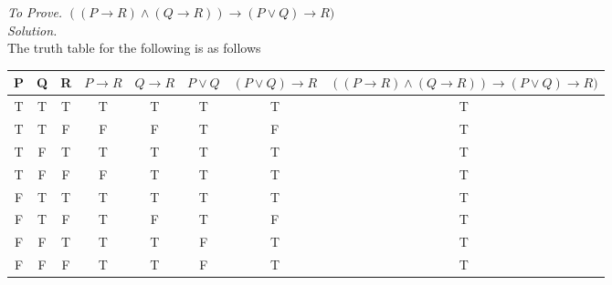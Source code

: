 \documentclass[11pt]{article}
\begin{document}
\vspace{20pt}
\noindent \emph{To Prove. } $((P \longrightarrow R)\land(Q \longrightarrow R))\longrightarrow(P \lor Q)\longrightarrow R)$ \medskip \\
\emph{Solution. } \\
The truth table for the following is as follows \\
\begingroup
\centering
\begin{tabular}{|c|c|c|c|c|c|c|c|}
	\hline
	P & Q & R & $P \longrightarrow R$ & $Q \longrightarrow R$ & $P \lor Q$ & $(P \lor Q) \longrightarrow R$ & $((P \longrightarrow R)\land(Q \longrightarrow R))\longrightarrow(P \lor Q)\longrightarrow R)$ \\
	\hline
	T & T & T & T                     & T                     & T          & T                              & T                                                                                              \\
	T & T & F & F                     & F                     & T          & F                              & T                                                                                              \\
	T & F & T & T                     & T                     & T          & T                              & T                                                                                              \\
	T & F & F & F                     & T                     & T          & T                              & T                                                                                              \\
	F & T & T & T                     & T                     & T          & T                              & T                                                                                              \\
	F & T & F & T                     & F                     & T          & F                              & T                                                                                              \\
	F & F & T & T                     & T                     & F          & T                              & T                                                                                              \\
	F & F & F & T                     & T                     & F          & T                              & T                                                                                              \\
	\hline
\end{tabular}
\endgroup
\end{document}
